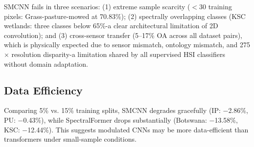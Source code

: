 \documentclass[conference]{IEEEtran}
\begin{document}
{{SMCNN fails in three scenarios: (1) extreme sample scarcity ($<$30 training pixels: Grass-pasture-mowed at 70.83\%); (2) spectrally overlapping classes (KSC wetlands: three classes below 65\%-a clear architectural limitation of 2D convolution); and (3) cross-sensor transfer (5--17\% OA across all dataset pairs), which is physically expected due to sensor mismatch, ontology mismatch, and 275$\times$ resolution disparity-a limitation shared by all supervised HSI classifiers without domain adaptation.

\subsection{Data Efficiency}

Comparing 5\% vs. 15\% training splits, SMCNN degrades gracefully (IP: $-$2.86\%, PU: $-$0.43\%), while SpectralFormer drops substantially (Botswana: $-$13.58\%, KSC: $-$12.44\%). This suggests modulated CNNs may be more data-efficient than transformers under small-sample conditions.

\subsection{\label{sec:
This study has significant 
\subsection{Lightweight CNNs vs. Transformer Architectures}
While Transformers excel at global sequence modeling, dynamically modulated CNNs (like SMCNN) offer a parameter-efficient, faster-training alternative that retains local spatial inductive biases while successfully adapting to global spectral contexts---making them highly suitable for precision agriculture on edge devices.

Crucially, the success of SMCNN reveals a broader scientific insight: in regimes governed by high spectral dimensionality but extreme spatial data scarcity, local structural priors (CNNs) coupled with global spectral context (SSMRB) provide a more statistically efficient learning paradigm than attempting to learn spatial-spectral dependencies from scratch (Transformers). This suggests that adaptive feature modulation can effectively bridge the representational gap between CNNs and Transformers in resource-constrained environments.




}}}}
\end{document}
